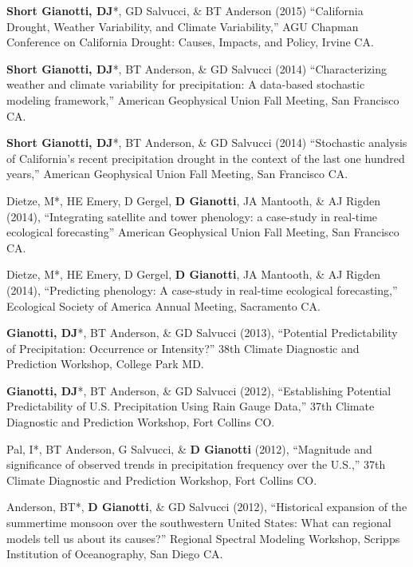 \documentclass[10pt, a4paper]{article}
\newcommand{\lbr}{\vspace*{12pt}}
\newcommand{\years}[1]{\mbox{}\marginnote{\scriptsize #1}} %
\begin{document}
\years{2015}\textbf{Short Gianotti, DJ}*, GD Salvucci, \& BT Anderson (2015) ``California Drought, Weather Variability, and Climate Variability,'' AGU Chapman Conference on California Drought: Causes, Impacts, and Policy, Irvine CA.\lbr

\years{2014}\textbf{Short Gianotti, DJ}*, BT Anderson, \& GD Salvucci (2014) ``Characterizing weather and climate variability for precipitation: A data-based stochastic modeling framework,'' American Geophysical Union Fall Meeting, San Francisco CA.\lbr

\years{2014}\textbf{Short Gianotti, DJ}*, BT Anderson, \& GD Salvucci (2014) ``Stochastic analysis of California's recent precipitation drought in the context of the last one hundred years,'' American Geophysical Union Fall Meeting, San Francisco CA.\lbr

\years{2014}Dietze, M*, HE Emery, D Gergel, \textbf{D Gianotti}, JA Mantooth, \& AJ Rigden (2014), ``Integrating satellite and tower phenology: a case-study in real-time ecological forecasting'' American Geophysical Union Fall Meeting, San Francisco CA.\lbr

\years{2014}Dietze, M*, HE Emery, D Gergel, \textbf{D Gianotti}, JA Mantooth, \& AJ Rigden (2014), ``Predicting phenology: A case-study in real-time ecological forecasting,'' Ecological Society of America Annual Meeting, Sacramento CA.\lbr

\years{2013}\textbf{Gianotti, DJ}*, BT Anderson, \& GD Salvucci  (2013), ``Potential Predictability of Precipitation: Occurrence or Intensity?'' 38th Climate Diagnostic and Prediction Workshop, College Park MD.\lbr

\years{2012}\textbf{Gianotti, DJ}*, BT Anderson, \& GD Salvucci (2012), ``Establishing Potential Predictability of U.S. Precipitation Using Rain Gauge Data,'' 37th Climate Diagnostic and Prediction Workshop, Fort Collins CO.\lbr

\years{2012}Pal, I*, BT Anderson, G Salvucci, \& \textbf{D Gianotti}  (2012), ``Magnitude and significance of observed trends in precipitation frequency over the U.S.,'' 37th Climate Diagnostic and Prediction Workshop, Fort Collins CO.\lbr

\years{2012}Anderson, BT*, \textbf{D Gianotti}, \& GD Salvucci (2012), ``Historical expansion of the summertime monsoon over the southwestern United States: What can regional models tell us about its causes?'' Regional Spectral Modeling Workshop, Scripps Institution of Oceanography, San Diego CA.\lbr
\end{document}
